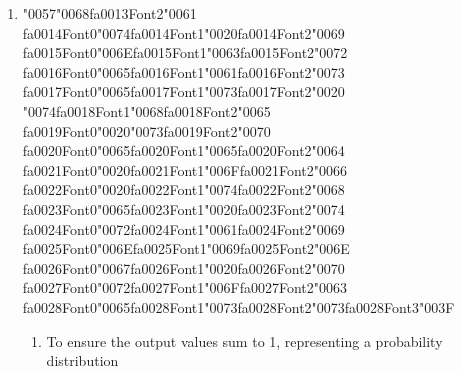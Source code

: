 \documentclass[12pt]{article}
\begin{document}
\begin{enumerate}[label=Q\arabic*.]
\begin{enumerate}[label=(\Alph*)]
    \item To store the final output of the entire sequence.
    \item To act as a memory that carries information from previous time steps
    \item To calculate the loss function for the current word
    \item To normalize the input embeddings
\end{enumerate}
\item {\char"0057}{\char"0068}{\csname fa0013Font2\endcsname\char"0061} {\csname fa0014Font0\endcsname\char"0074}{\csname fa0014Font1\endcsname\char"0020}{\csname fa0014Font2\endcsname\char"0069} {\csname fa0015Font0\endcsname\char"006E}{\csname fa0015Font1\endcsname\char"0063}{\csname fa0015Font2\endcsname\char"0072} {\csname fa0016Font0\endcsname\char"0065}{\csname fa0016Font1\endcsname\char"0061}{\csname fa0016Font2\endcsname\char"0073} {\csname fa0017Font0\endcsname\char"0065}{\csname fa0017Font1\endcsname\char"0073}{\csname fa0017Font2\endcsname\char"0020} {\char"0074}{\csname fa0018Font1\endcsname\char"0068}{\csname fa0018Font2\endcsname\char"0065} {\csname fa0019Font0\endcsname\char"0020}{\char"0073}{\csname fa0019Font2\endcsname\char"0070} {\csname fa0020Font0\endcsname\char"0065}{\csname fa0020Font1\endcsname\char"0065}{\csname fa0020Font2\endcsname\char"0064} {\csname fa0021Font0\endcsname\char"0020}{\csname fa0021Font1\endcsname\char"006F}{\csname fa0021Font2\endcsname\char"0066} {\csname fa0022Font0\endcsname\char"0020}{\csname fa0022Font1\endcsname\char"0074}{\csname fa0022Font2\endcsname\char"0068} {\csname fa0023Font0\endcsname\char"0065}{\csname fa0023Font1\endcsname\char"0020}{\csname fa0023Font2\endcsname\char"0074} {\csname fa0024Font0\endcsname\char"0072}{\csname fa0024Font1\endcsname\char"0061}{\csname fa0024Font2\endcsname\char"0069} {\csname fa0025Font0\endcsname\char"006E}{\csname fa0025Font1\endcsname\char"0069}{\csname fa0025Font2\endcsname\char"006E} {\csname fa0026Font0\endcsname\char"0067}{\csname fa0026Font1\endcsname\char"0020}{\csname fa0026Font2\endcsname\char"0070} {\csname fa0027Font0\endcsname\char"0072}{\csname fa0027Font1\endcsname\char"006F}{\csname fa0027Font2\endcsname\char"0063} {\csname fa0028Font0\endcsname\char"0065}{\csname fa0028Font1\endcsname\char"0073}{\csname fa0028Font2\endcsname\char"0073}{\csname fa0028Font3\endcsname\char"003F}
\begin{enumerate}[label=(\Alph*)]
    \item To ensure the output values sum to 1, representing a probability distribution

\end{enumerate}
\end{enumerate}
\end{document}
